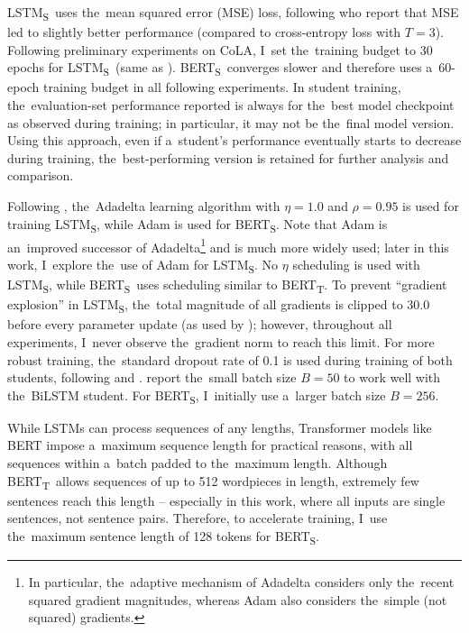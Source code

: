\documentclass[bsc,frontabs,singlespacing,parskip,deptreport]{infthesis}
\def\BERTT{BERT\textsubscript{T}}
\def\BERTS{BERT\textsubscript{S}}
\def\LSTMS{LSTM\textsubscript{S}}
\begin{document}
{{{      \LSTMS~uses the~mean squared error (MSE) loss, following \citeauthor{Tang_2019b} who report that MSE led to slightly better performance (compared to cross-entropy loss with $T=3$). Following preliminary experiments on CoLA, I~set the~training budget to 30 epochs for \LSTMS~(same as \citeauthor{Tang_2019b}). \BERTS~converges slower and therefore uses a~60-epoch training budget in all following experiments. In student training, the~evaluation-set performance reported is always for the~best model checkpoint as observed during training; in particular, it may not be the~final model version.
      Using this approach, even if a~student's performance eventually starts to decrease during training, the~best-performing version is retained for further analysis and comparison.

      Following \citeauthor{Tang_2019b}, the~Adadelta learning algorithm \citep{Zeiler_2012} with $\eta=1.0$ and $\rho=0.95$ is used for training \LSTMS, while Adam is used for \BERTS.
      Note that Adam is an~improved successor of Adadelta\footnote{In particular, the~adaptive mechanism of Adadelta considers only the~recent squared gradient magnitudes, whereas Adam also considers the~simple (not squared) gradients.} and is much more widely used; later in this work, I~explore the~use of Adam for \LSTMS. No $\eta$ scheduling is used with \LSTMS, while \BERTS~uses scheduling similar to \BERTT.
      To prevent ``gradient explosion'' in \LSTMS, the~total magnitude of all gradients is clipped to 30.0 before every parameter update (as used by \citeauthor{Tang_2019b}); however, throughout all experiments, I~never observe the~gradient norm to reach this limit.
      For more robust training, the~standard dropout rate of 0.1 is used during training of both students, following \citet{Devlin_2018} and \citeauthor{Tang_2019b}.
      \citeauthor{Tang_2019b} report the~small batch size $B=50$ to work well with the~BiLSTM student. For \BERTS, I~initially use a~larger batch size $B=256$.

      While LSTMs can process sequences of any lengths, Transformer models like BERT impose a~maximum sequence length for practical reasons, with all sequences within a~batch padded to the~maximum length. Although \BERTT~allows sequences of up to 512 wordpieces in length, extremely few sentences reach this length -- especially in this work, where all inputs are single sentences, not sentence pairs. Therefore, to accelerate training, I~use the~maximum sentence length of 128 tokens for \BERTS.

}}}
\end{document}
